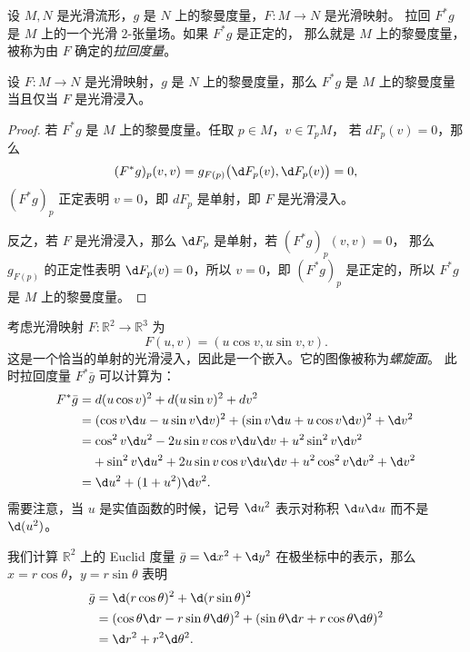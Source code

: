 设 $M,N$ 是光滑流形，$g$ 是 $N$ 上的黎曼度量，$F:M\to N$ 是光滑映射。
拉回 $F^*g$ 是 $M$ 上的一个光滑 $2$-张量场。如果 $F^*g$ 是正定的，
那么就是 $M$ 上的黎曼度量，被称为由 $F$ 确定的\emph{拉回度量}。

\begin{proposition}[拉回度量判别法]
  设 $F:M\to N$ 是光滑映射，$g$ 是 $N$ 上的黎曼度量，那么 
  $F^*g$ 是 $M$ 上的黎曼度量当且仅当 $F$ 是光滑浸入。
\end{proposition}
\begin{proof}
  若 $F^*g$ 是 $M$ 上的黎曼度量。任取 $p\in M$，$v\in T_pM$，
  若 $dF_p(v)=0$，那么
  \[
    (F^*g)_p(v,v)=g_{F(p)}\bigl(\d F_p(v),\d F_p(v)\bigr)  =0,
  \]
  $(F^*g)_p$ 正定表明 $v=0$，即 $dF_p$ 是单射，即 $F$ 是光滑浸入。

  反之，若 $F$ 是光滑浸入，那么 $\d F_p$ 是单射，若 $(F^*g)_p(v,v)=0$，
  那么 $g_{F(p)}$ 的正定性表明 $\d F_p(v)=0$，所以 $v=0$，即
  $(F^*g)_p$ 是正定的，所以 $F^*g$ 是 $M$ 上的黎曼度量。
\end{proof}

\begin{example}
  考虑光滑映射 $F: \mathbb{R}^2\to \mathbb{R}^3$ 为
  \[
    F(u,v)=(u\cos v,u\sin v,v).
  \]
  这是一个恰当的单射的光滑浸入，因此是一个嵌入。它的图像被称为\emph{螺旋面}。
  此时拉回度量 $F^*\bar g$ 可以计算为：
  \begin{align*}
    F^*\bar g&=d(u\cos v)^2+d(u\sin v)^2+dv^2\\
    &=(\cos v\d u-u\sin v\d v)^2+(\sin v\d u+u\cos v\d v)^2+\d v^2\\
    &=\cos^2 v\d u^2-2u\sin v\cos v\d u\d v+u^2\sin^2 v\d v^2\\
    &\hphantom{{}=}+\sin^2 v\d u^2+2u\sin v\cos v\d u\d v+u^2\cos^2 v\d v^2 
    +\d v^2\\
    &=\d u^2+(1+u^2)\d v^2.
  \end{align*}
  需要注意，当 $u$ 是实值函数的时候，记号 $\d u^2$ 表示对称积 $\d u\d u$
  而不是 $\d (u^2)$。
\end{example}

\begin{example}\label{exa:polar coordinate of euclid metric}
  我们计算 $\mathbb{R}^2$ 上的 Euclid 度量 $\bar g=\d x^2+\d y^2$
  在极坐标中的表示，那么 $x=r\cos\theta$，$y=r\sin\theta$ 表明
  \begin{align*}
    \bar g&=\d (r\cos\theta)^2+\d (r\sin\theta)^2\\
    &=(\cos\theta\d r-r\sin\theta\d\theta)^2+(\sin\theta\d r+r\cos\theta\d\theta)^2\\
    &=\d r^2+r^2\d\theta^2.
  \end{align*}
\end{example}

